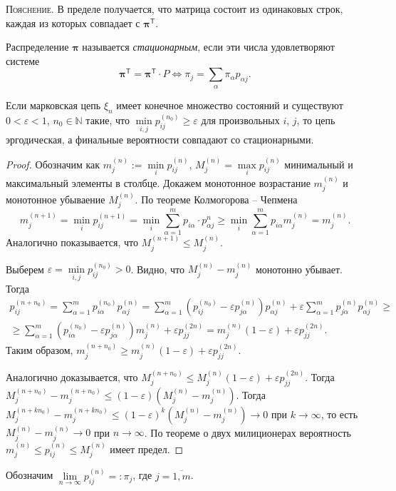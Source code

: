 \textsc{Пояснение}.\hspace{.15em} В пределе получается, что матрица состоит из одинаковых строк, каждая из
которых совпадает с $\bm{\pi}^{\mathsf T}$.

\begin{definition}
  Распределение $\bm{\pi}$ называется \emph{стационарным}, если эти числа удовлетворяют
  системе
  \[
    \bm{\pi}^{\mathsf T} = \bm{\pi}^{\mathsf T} \cdot P
    \Leftrightarrow 
    \pi_j = \sum_\alpha \pi_\alpha p_{\alpha j}.
  \]
\end{definition}

\begin{theorem}
  Если марковская цепь $\xi_n$ имеет конечное множество состояний и существуют $0
  <\varepsilon < 1$,
  $n_0 \in \mathbb N$ такие, что $\min\limits_{i, j} p_{ij}^{(n_0)} \geqslant
  \varepsilon$ для произвольных $ i $, $ j $, то цепь эргодическая, а
  финальные вероятности совпадают со стационарными.
\end{theorem}
\begin{proof}
  Обозначим как $m_j^{(n)} := \min\limits_i p_{ij}^{(n)}$, $M_j^{(n)} = \max\limits_i p_{ij}^{(n)}$ минимальный 
  и максимальный элементы в столбце. Докажем монотонное возрастание $m_{j}^{(n)}$ и монотонное
  убываение $M_j^{(n)}$. По теореме Колмогорова -- Чепмена
  \[
    m_{j}^{(n+1)} = \min_i p_{ij}^{(n+1)}
    = \min_i \sum_{\alpha=1}^m p_{i\alpha} \cdot p_{\alpha j}^{n} \geqslant 
    \min_i \sum_{\alpha=1}^m p_{i \alpha} m_j^{(n)}
    = m_j^{(n)}.
  \]
  Аналогично показывается, что $M_{j}^{(n+1)} \leqslant M_j^{(n)}$.

  Выберем $\varepsilon = \min\limits_{i, j} p_{ij}^{(n_0)} > 0$.
  Видно, что $M_j^{(n)}-m_j^{(n)}$ монотонно убывает. Тогда
  \begin{multline*}
    p_{ij}^{(n+n_0)} = \sum_{\alpha=1}^m p_{i\alpha}^{(n_0)} p_{\alpha j}^{(n)}
    = \sum_{\alpha=1}^m (p_{ij}^{(n_0)} - \varepsilon p_{j \alpha}^{(n)}) p_{\alpha j}^{(n)}
      + \varepsilon \sum_{\alpha=1}^m p_{j \alpha}^{(n)} p_{\alpha j}^{(n)} \geqslant \\
    \geqslant \sum_{\alpha=1}^m (p_{i\alpha}^{(n_0)} - \varepsilon p_{j\alpha}^{(n)}) m_j^{(n)}
      + \varepsilon p_{jj}^{(2n)}
    = m_j^{(n)} (1-\varepsilon) + \varepsilon p_{jj}^{(2n)}.
  \end{multline*}
  Таким образом, $m_j^{(n+n_0)} \geqslant m_j^{(n)} (1-\varepsilon) + \varepsilon p_{jj}^{(2n)}$.
  
  Аналогично доказывается, что $M_j^{(n+n_0)} \leqslant M_j^{(n)}
  (1-\varepsilon) + \varepsilon p_{jj}^{(2n)}$.
  Тогда $M_{j}^{(n+n_0)} - m_j^{(n+n_0)} \leqslant (1-\varepsilon) (M_j^{(n)} - m_j^{(n)})$. 
  Тогда $M_j^{(n+kn_0)} - m_j^{(n+kn_0)} \leqslant (1-\varepsilon)^k (M_j^{(n)}
  - m_j^{(n)}) \to 0$ при $ k\to \infty$, то есть $M_{j}^{(n)} - m_j^{(n)} \to
  0$ при $ n \to \infty$. По теореме о двух милиционерах
  вероятность $m_j^{(n)} \leqslant p_{ij}^{(n)} \leqslant M_j^{(n)}$ имеет
  предел.
\end{proof}
Обозначим $\lim\limits_{n\to\infty} p_{ij}^{(n)} =: \pi_j$, где $j = \overline{1, m}$. 

